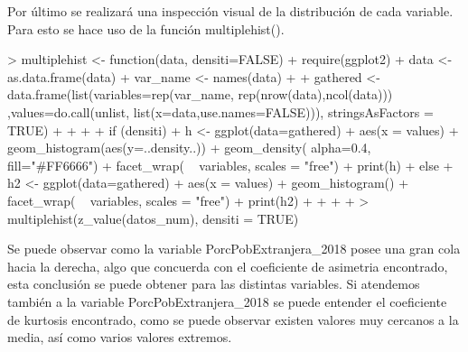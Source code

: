 \documentclass[11pt]{article}
\begin{document}
Por último se realizará una inspección visual de la distribución de cada variable. Para esto se hace uso de la función multiplehist().
\begin{Schunk}
\begin{Sinput}
> multiplehist <- function(data, densiti=FALSE){
+   require(ggplot2)
+   data <- as.data.frame(data)
+   var_name <- names(data)
+   
+   gathered <- data.frame(list(variables=rep(var_name, rep(nrow(data),ncol(data))) ,values=do.call(unlist, list(x=data,use.names=FALSE))), stringsAsFactors = TRUE)
+   
+   
+   
+   if (densiti){
+     h <- ggplot(data=gathered) + aes(x = values) + geom_histogram(aes(y=..density..)) + geom_density( alpha=0.4, fill="#FF6666") + facet_wrap( ~ variables, scales = "free")
+     print(h)
+   }else{
+     h2 <- ggplot(data=gathered) + aes(x = values) + geom_histogram()  + facet_wrap( ~ variables, scales = "free")
+     print(h2)
+   }
+   
+   
+ }
> multiplehist(z_value(datos_num), densiti = TRUE)
\end{Sinput}
\end{Schunk}
Se puede observar como la variable PorcPobExtranjera\_2018 posee una gran cola hacia la derecha, algo que concuerda con el coeficiente de asimetria encontrado, esta conclusión se puede obtener para las distintas variables. Si atendemos también a la variable PorcPobExtranjera\_2018 se puede entender el coeficiente de kurtosis encontrado, como se puede observar existen valores muy cercanos a la media, así como varios valores extremos.
\end{document}
